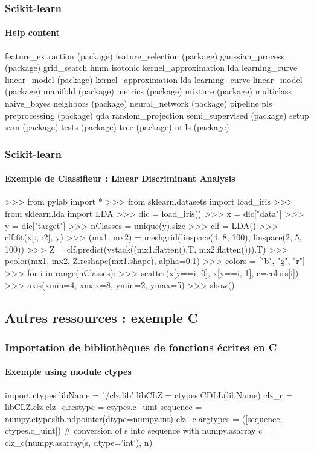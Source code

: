 \begin{frame}[fragile]
\frametitle{Scikit-learn}
\framesubtitle{Help content}
\begin{pythonConsole}
    feature_extraction (package)
    feature_selection (package)
    gaussian_process (package)
    grid_search
    hmm
    isotonic
    kernel_approximation
    lda
    learning_curve
    linear_model (package)
    kernel_approximation
    lda
    learning_curve
    linear_model (package)
    manifold (package)
    metrics (package)
    mixture (package)
    multiclass
    naive_bayes
    neighbors (package)
    neural_network (package)
    pipeline
    pls
    preprocessing (package)
    qda
    random_projection
    semi_supervised (package)
    setup
    svm (package)
    tests (package)
    tree (package)
    utils (package)
\end{pythonConsole}
\end{frame}
\begin{frame}[fragile]
\frametitle{Scikit-learn}
\framesubtitle{Exemple de Classifieur : Linear Discriminant Analysis}
\begin{pythonConsole}
>>> from pylab import *
>>> from sklearn.datasets import load_iris
>>> from sklearn.lda import LDA
>>> dic = load_iris()
>>> x = dic["data"]
>>> y = dic["target"]
>>> nClasses = unique(y).size
>>> clf = LDA()
>>> clf.fit(x[:, :2], y)
>>> (mx1, mx2) = meshgrid(linspace(4, 8, 100), linspace(2, 5, 100))
>>> Z = clf.predict(vstack((mx1.flatten().T, mx2.flatten())).T)
>>> pcolor(mx1, mx2, Z.reshape(mx1.shape), alpha=0.1)
>>> colors = ["b", "g", "r"]
>>> for i in range(nClasses): 
>>>   scatter(x[y==i, 0], x[y==i, 1], c=colors[i])
>>> axis(xmin=4, xmax=8, ymin=2, ymax=5)
>>> show()
\end{pythonConsole}
\end{frame}
\subsection{Autres ressources : exemple C}
\begin{frame}[fragile]
\frametitle{Importation de bibliothèques de fonctions écrites en C}
\framesubtitle{Exemple using module ctypes}
\begin{python}
import ctypes
libName = './clz.lib'
libCLZ = ctypes.CDLL(libName)
clz_c = libCLZ.clz
clz_c.restype = ctypes.c_uint
sequence = numpy.ctypeslib.ndpointer(dtype=numpy.int) 
clz_c.argtypes = ([sequence, ctypes.c_uint])
# conversion of s into sequence with numpy.asarray
c = clz_c(numpy.asarray(s, dtype='int'), n)
\end{python}
\end{frame}

